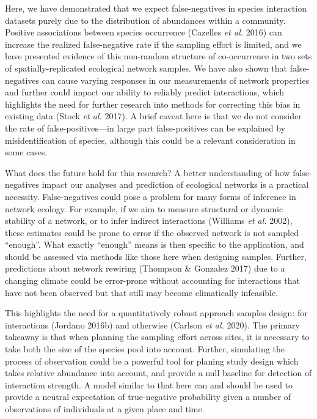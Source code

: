 \documentclass[10pt,oneside]{article}
\begin{document}
Here, we have demonstrated that we expect false-negatives in species
interaction datasets purely due to the distribution of abundances within
a community. Positive associations between species occurrence (Cazelles
\emph{et al.} 2016) can increase the realized false-negative rate if the
sampling effort is limited, and we have presented evidence of this
non-random structure of co-occurrence in two sets of
spatially-replicated ecological network samples. We have also shown that
false-negatives can cause varying responses in our measurements of
network properties and further could impact our ability to reliably
predict interactions, which highlights the need for further research
into methods for correcting this bias in existing data (Stock \emph{et
al.} 2017). A brief caveat here is that we do not consider the rate of
false-positives---in large part false-positives can be explained by
misidentification of species, although this could be a relevant
consideration in some cases.

What does the future hold for this research? A better understanding of
how false-negatives impact our analyses and prediction of ecological
networks is a practical necessity. False-negatives could pose a problem
for many forms of inference in network ecology. For example, if we aim
to measure structural or dynamic stability of a network, or to infer
indirect interactions (Williams \emph{et al.} 2002), these estimates
could be prone to error if the observed network is not sampled
``enough''. What exactly ``enough'' means is then specific to the
application, and should be assessed via methods like those here when
designing samples. Further, predictions about network rewiring (Thompson
\& Gonzalez 2017) due to a changing climate could be error-prone without
accounting for interactions that have not been observed but that still
may become climatically infeasible.

This highlights the need for a quantitatively robust approach samples
design: for interactions (Jordano 2016b) and otherwise (Carlson \emph{et
al.} 2020). The primary takeaway is that when planning the sampling
effort across sites, it is necessary to take both the size of the
species pool into account. Further, simulating the process of
observation could be a powerful tool for planing study design which
takes relative abundance into account, and provide a null baseline for
detection of interaction strength. A model similar to that here can and
should be used to provide a neutral expectation of true-negative
probability given a number of observations of individuals at a given
place and time.
\end{document}
